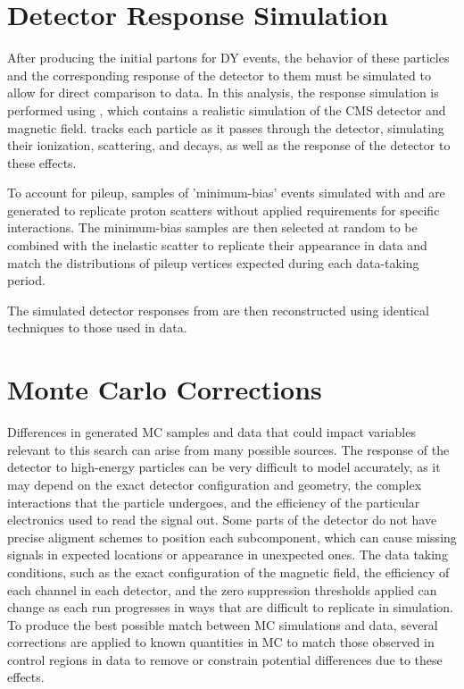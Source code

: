 \section{Detector Response Simulation}

After producing the initial partons for DY events, the behavior of these particles and the corresponding response of the detector to them must be simulated to allow for direct comparison to data.
In this analysis, the response simulation is performed using \geant, which contains a realistic simulation of the CMS detector and magnetic field.
\geant tracks each particle as it passes through the detector, simulating their ionization, scattering, and decays, as well as the response of the detector to these effects.

To account for pileup, samples of 'minimum-bias' events simulated with \pythia and \geant are generated to replicate proton scatters without applied requirements for specific interactions.
The minimum-bias samples are then selected at random to be combined with the inelastic scatter to replicate their appearance in data and match the distributions of pileup vertices expected during each data-taking period.

The simulated detector responses from \geant are then reconstructed using identical techniques to those used in data. 

\section{Monte Carlo Corrections}
Differences in generated MC samples and data that could impact variables relevant to this search can arise from many possible sources.
The response of the detector to high-energy particles can be very difficult to model accurately, as it may depend on the exact detector configuration and geometry, the complex interactions that the particle undergoes, and the efficiency of the particular electronics used to read the signal out.
Some parts of the detector do not have precise aligment schemes to position each subcomponent, which can cause missing signals in expected locations or appearance in unexpected ones. 
The data taking conditions, such as the exact configuration of the magnetic field, the efficiency of each channel in each detector, and the zero suppression thresholds applied can change as each run progresses in ways that are difficult to replicate in simulation.
To produce the best possible match between MC simulations and data, several corrections are applied to known quantities in MC to match those observed in control regions in data to remove or constrain potential differences due to these effects.

